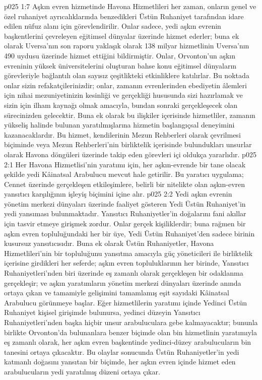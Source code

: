 \vs p025 1:7 Aşkın evren hizmetinde Havona Hizmetlileri her zaman, onların genel ve özel ruhaniyet ayrıcalıklarında benzedikleri Üstün Ruhaniyet tarafından idare edilen nüfuz alanı için görevlendirilir. Onlar sadece, yedi aşkın evrenin başkentlerini çevreleyen eğitimsel dünyalar üzerinde hizmet ederler; buna ek olarak Uversa’nın son raporu yaklaşık olarak 138 milyar hizmetlinin Uversa’nın 490 uydusu üzerinde hizmet ettiğini bildirmiştir. Onlar, Orvonton’un aşkın evreninin yüksek üniversitelerini oluşturan bahse konu eğitimsel dünyaların görevleriyle bağlantılı olan sayısız çeşitlikteki etkinliklere katılırlar. Bu noktada onlar sizin refakatçilerinizdir; onlar, zamanın evrenlerinden ebediyetin âlemleri için nihai mezuniyetinizin kesinliği ve gerçekliği hususunda sizi hazırlamak ve sizin için ilham kaynağı olmak amacıyla, bundan sonraki gerçekleşecek olan sürecinizden gelecektir. Buna ek olarak bu ilişkiler içerisinde hizmetliler, zamanın yükseliş halinde bulunan yaratılmışlarına hizmetin başlangıçsal deneyimini kazanacaklardır. Bu hizmet, kendilerinin Mezun Rehberleri olarak çevrilmesi biçiminde veya Mezun Rehberleri’nin birliktelik içerisinde bulundukları unsurlar olarak Havona döngüleri üzerinde takip eden görevleri içi oldukça yararlıdır.
\vs p025 2:1 Her Havona Hizmetlisi'nin yaratımı için, her aşkın\hyp{}evrende bir tane olacak şekilde yedi Kâinatsal Arabulucu mevcut hale getirilir. Bu yaratıcı uygulama; Cennet üzerinde gerçekleşen etkileşimlere, belirli bir nitelikte olan aşkın\hyp{}evren yansıtıcı karşılığının işleyiş biçimini içine alır.
\vs p025 2:2 Yedi aşkın evrenin yönetim merkezi dünyaları üzerinde faaliyet gösteren Yedi Üstün Ruhaniyet’in yedi yansıması bulunmaktadır. Yansıtıcı Ruhaniyetler’in doğalarını fani akıllar için tasvir etmeye girişmek zordur. Onlar gerçek kişiliklerdir; buna rağmen bir aşkın evren topluluğundaki her bir üye, Yedi Üstün Ruhaniyet’den sadece birinin kusursuz yansıtıcısıdır. Buna ek olarak Üstün Ruhaniyetler, Havona Hizmetlileri’nin bir topluluğunu yansıtma amacıyla güç yöneticileri ile birliktelik içerisine girdikleri her seferde; aşkın evren topluluklarının her birinde, Yansıtıcı Ruhaniyetleri’nden biri üzerinde eş zamanlı olarak gerçekleşen bir odaklanma gerçekleşir; ve aşkın yaratımların yönetim merkezi dünyaları üzerinde anında ortaya çıkan ve tamamiyle gelişimini tamamlamış eşit sayıdaki Kâinatsal Arabulucu görünmeye başlar. Eğer hizmetlilerin yaratımı içinde Yedinci Üstün Ruhaniyet kişisel girişimde bulunursa, yedinci düzeyin Yansıtıcı Ruhaniyetleri’nden başka hiçbir unsur arabuluculara gebe kalmayacaktır; bununla birlikte Orvonton’da bulunanlara benzer biçimde olan bin hizmetlinin yaratımıyla eş zamanlı olarak, her aşkın evren başkentinde yedinci\hyp{}düzey arabulucuların bin tanesini ortaya çıkacaktır. Bu olaylar sonucunda Üstün Ruhaniyetler’in yedi katmanlı doğasını yansıtan bir biçimde, her aşkın evren içinde hizmet eden arabulucuların yedi yaratılmış düzeni ortaya çıkar.
